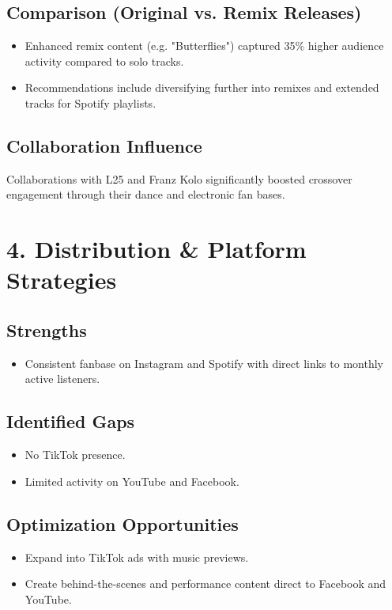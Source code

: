 \documentclass[a4paper,12pt]{article}
\begin{document}
\subsection*{Comparison (Original vs. Remix Releases)}
\begin{itemize}
    \item Enhanced remix content (e.g. "Butterflies") captured 35\% higher audience activity compared to solo tracks.
    \item Recommendations include diversifying further into remixes and extended tracks for Spotify playlists.
\end{itemize}

\subsection*{Collaboration Influence}
Collaborations with L25 and Franz Kolo significantly boosted crossover engagement through their dance and electronic fan bases.

\vspace{1cm}

\section*{4. Distribution \& Platform Strategies}
\subsection*{Strengths}
\begin{itemize}
    \item Consistent fanbase on Instagram and Spotify with direct links to monthly active listeners.
\end{itemize}

\subsection*{Identified Gaps}
\begin{itemize}
    \item No TikTok presence.
    \item Limited activity on YouTube and Facebook.
\end{itemize}

\subsection*{Optimization Opportunities}
\begin{itemize}
    \item Expand into TikTok ads with music previews.
    \item Create behind-the-scenes and performance content direct to Facebook and YouTube.
\end{itemize}
\end{document}
